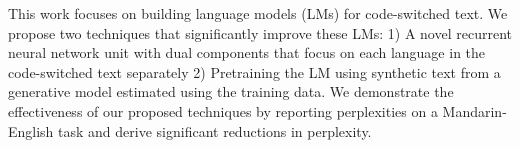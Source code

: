 This work focuses on building language models (LMs) for code-switched text. We propose two techniques that significantly improve these LMs: 1) A novel recurrent neural network unit with dual components that focus on each language in the code-switched text separately 2) Pretraining the LM using synthetic text from a generative model estimated using the training data. We demonstrate the effectiveness of our proposed techniques by reporting perplexities on a Mandarin-English task and derive significant reductions in perplexity.
